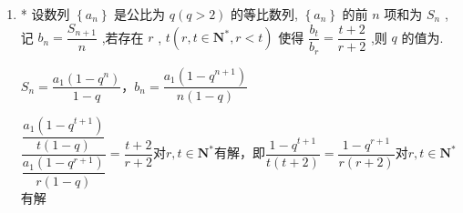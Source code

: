 \begin{enumerate}
    \begin{jieda}
        $2\sqrt{b_2} = \sqrt{\dfrac{b_2}{q}} + \sqrt{q b_2}$，即$2 = \sqrt{q}+\dfrac{1}{\sqrt{q}}$，解得$q = 3+2\sqrt{2}$
    \end{jieda}
    \item * 设数列 $\left\{  {a}_{n}\right\}$ 是公比为 $q\left( {q > 2}\right)$ 的等比数列, $\left\{  {a}_{n}\right\}$ 的前 $n$ 项和为 ${S}_{n}$ ,记 ${b}_{n} = \dfrac{{S}_{n + 1}}{n}$ ,若存在 $r$ , $t\left( {r,t \in  {\mathbf{N}}^{ * },r < t}\right)$ 使得 $\dfrac{{b}_{t}}{{b}_{r}} = \dfrac{t + 2}{r + 2}$ ,则 $q$ 的值为.
    \begin{jieda}
        $S_n = \dfrac{a_1(1-q^n)}{1-q}$，$b_n = \dfrac{a_1(1-q^{n+1})}{n(1-q)}$

        $\dfrac{\dfrac{a_1(1-q^{t+1})}{t(1-q)}}{\dfrac{a_1(1-q^{r+1})}{r(1-q)}} = \dfrac{t+2}{r+2}$对$r,t \in  {\mathbf{N}}^{ * }$有解，即$\dfrac{1-q^{t+1}}{t(t+2)}= \dfrac{1-q^{r+1}}{r(r+2)}$对$r,t \in  {\mathbf{N}}^{ * }$有解
        

\end{jieda}
\end{enumerate}
